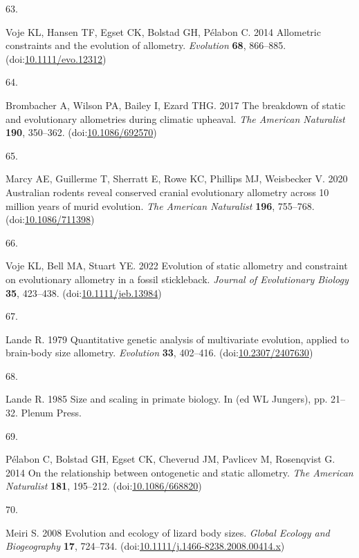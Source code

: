 \documentclass[
  11pt,
]{article}
\newlength{\cslhangindent}
\newlength{\csllabelwidth}
\newlength{\cslentryspacingunit} %
\newenvironment{CSLReferences}[2] %
 {%
  \setlength{\parindent}{0pt}
  \ifodd #1
  \let\oldpar\par
  \def\par{\hangindent=\cslhangindent\oldpar}
  \fi
  \setlength{\parskip}{#2\cslentryspacingunit}
 }%
 {}
\newcommand{\CSLLeftMargin}[1]{\parbox[t]{\csllabelwidth}{#1}}
\newcommand{\CSLRightInline}[1]{\parbox[t]{\linewidth - \csllabelwidth}{#1}\break}
\begin{document}
\begin{CSLReferences}{0}{0}
\leavevmode{}%
\CSLLeftMargin{63. }%
\CSLRightInline{Voje KL, Hansen TF, Egset CK, Bolstad GH, Pélabon C.
2014 Allometric constraints and the evolution of allometry.
\emph{Evolution} \textbf{68}, 866--885.
(doi:\href{https://doi.org/10.1111/evo.12312}{10.1111/evo.12312})}

\leavevmode{}%
\CSLLeftMargin{64. }%
\CSLRightInline{Brombacher A, Wilson PA, Bailey I, Ezard THG. 2017 The
breakdown of static and evolutionary allometries during climatic
upheaval. \emph{The American Naturalist} \textbf{190}, 350--362.
(doi:\href{https://doi.org/10.1086/692570}{10.1086/692570})}

\leavevmode{}%
\CSLLeftMargin{65. }%
\CSLRightInline{Marcy AE, Guillerme T, Sherratt E, Rowe KC, Phillips MJ,
Weisbecker V. 2020 Australian rodents reveal conserved cranial
evolutionary allometry across 10 million years of murid evolution.
\emph{The American Naturalist} \textbf{196}, 755--768.
(doi:\href{https://doi.org/10.1086/711398}{10.1086/711398})}

\leavevmode{}%
\CSLLeftMargin{66. }%
\CSLRightInline{Voje KL, Bell MA, Stuart YE. 2022 Evolution of static
allometry and constraint on evolutionary allometry in a fossil
stickleback. \emph{Journal of Evolutionary Biology} \textbf{35},
423--438.
(doi:\href{https://doi.org/10.1111/jeb.13984}{10.1111/jeb.13984})}

\leavevmode{}%
\CSLLeftMargin{67. }%
\CSLRightInline{Lande R. 1979 Quantitative genetic analysis of
multivariate evolution, applied to brain-body size allometry.
\emph{Evolution} \textbf{33}, 402--416.
(doi:\href{https://doi.org/10.2307/2407630}{10.2307/2407630})}

\leavevmode{}%
\CSLLeftMargin{68. }%
\CSLRightInline{Lande R. 1985 Size and scaling in primate biology. In
(ed WL Jungers), pp. 21--32. Plenum Press. }

\leavevmode{}%
\CSLLeftMargin{69. }%
\CSLRightInline{Pélabon C, Bolstad GH, Egset CK, Cheverud JM, Pavlicev
M, Rosenqvist G. 2014 On the relationship between ontogenetic and static
allometry. \emph{The American Naturalist} \textbf{181}, 195--212.
(doi:\href{https://doi.org/10.1086/668820}{10.1086/668820})}

\leavevmode{}%
\CSLLeftMargin{70. }%
\CSLRightInline{Meiri S. 2008 Evolution and ecology of lizard body
sizes. \emph{Global Ecology and Biogeography} \textbf{17}, 724--734.
(doi:\href{https://doi.org/10.1111/j.1466-8238.2008.00414.x}{10.1111/j.1466-8238.2008.00414.x})}


\end{CSLReferences}
\end{document}
